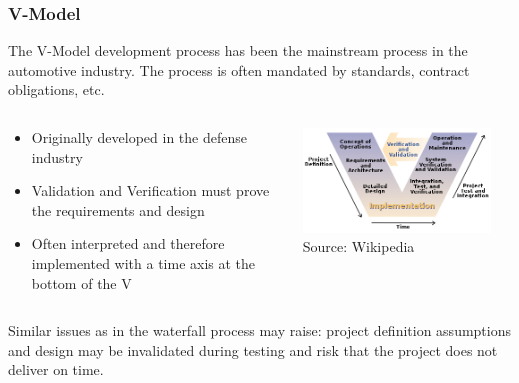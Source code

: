 \begin{frame}
\frametitle{V-Model}
The V-Model development process has been the mainstream process in the
automotive industry. The process is often mandated
by standards, contract obligations, etc.
\begin{columns}[]
    \begin{column}{0.6\textwidth}
        \begin{itemize}
            \item Originally developed in the defense industry
            \item Validation and Verification must prove the requirements and
                design
            \item Often interpreted and therefore implemented with a time
                axis at the bottom of the V
        \end{itemize}
    \end{column}
    \begin{column}{0.4\textwidth}
        \centering
        \includegraphics[width=0.9\textwidth]{images/v-model.png}\\
        \footnotesize Source: Wikipedia\footnotemark[1]
    \end{column}
\end{columns}
\begin{block}{}
Similar issues as in the waterfall process may raise: project definition
assumptions and design may be invalidated during testing and risk that the
project does not deliver on time.
\end{block}
\end{frame}

